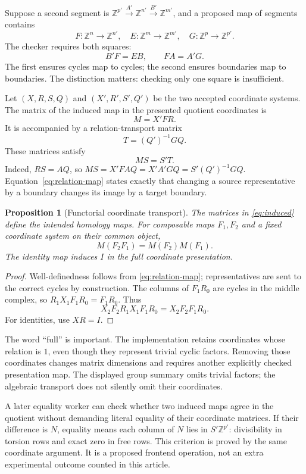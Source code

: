 \documentclass[11pt,letterpaper]{article}
\newtheorem{proposition}[theorem]{Proposition}
\theoremstyle{definition}\newtheorem{definition}[theorem]{Definition}
\theoremstyle{remark}\newtheorem{remark}[theorem]{Remark}
\newcommand{\Z}{\mathbb Z}\newcommand{\Q}{\mathbb Q}
\begin{document}
Suppose a second segment is $\Z^{p'}\xrightarrow{A'}\Z^{n'}
\xrightarrow{B'}\Z^{m'}$, and a proposed map of segments contains
\[
 F:\Z^n\to\Z^{n'},\quad E:\Z^m\to\Z^{m'},\quad
 G:\Z^p\to\Z^{p'}.
\]
The checker requires both squares:
\begin{equation}\label{eq:map-squares}
 B'F=EB,\qquad FA=A'G.
\end{equation}
The first ensures cycles map to cycles; the second ensures boundaries map to
boundaries. The distinction matters: checking only one square is insufficient.

Let $(X,R,S,Q)$ and $(X',R',S',Q')$ be the two accepted coordinate systems.
The matrix of the induced map in the presented quotient coordinates is
\begin{equation}\label{eq:induced}
 M=X'FR.
\end{equation}
It is accompanied by a relation-transport matrix
\[
 T=(Q')^{-1}GQ.
\]
These matrices satisfy
\begin{equation}\label{eq:relation-map}
 MS=S'T.
\end{equation}
Indeed, $RS=AQ$, so $MS=X'FAQ=X'A'GQ=S'(Q')^{-1}GQ$.
Equation~\eqref{eq:relation-map} states exactly that changing a source
representative by a boundary changes its image by a target boundary.

\begin{proposition}[Functorial coordinate transport]
The matrices in \eqref{eq:induced} define the intended homology maps. For
composable maps $F_1,F_2$ and a fixed coordinate system on their common object,
\[
 M(F_2F_1)=M(F_2)M(F_1).
\]
The identity map induces $I$ in the full coordinate presentation.
\end{proposition}
\begin{proof}
Well-definedness follows from \eqref{eq:relation-map}; representatives are sent
to the correct cycles by construction. The columns of $F_1R_0$ are cycles in
the middle complex, so $R_1X_1F_1R_0=F_1R_0$. Thus
\[
 X_2F_2R_1X_1F_1R_0=X_2F_2F_1R_0.
\]
For identities, use $XR=I$.
\end{proof}

The word ``full'' is important. The implementation retains coordinates whose
relation is $1$, even though they represent trivial cyclic factors. Removing
those coordinates changes matrix dimensions and requires another explicitly
checked presentation map. The displayed group summary omits trivial factors;
the algebraic transport does not silently omit their coordinates.

A later equality worker can check whether two induced maps agree in the
quotient without demanding literal equality of their coordinate matrices.
If their difference is $N$, equality means each column of $N$ lies in
$S'\Z^{p'}$: divisibility in torsion rows and exact zero in free rows.
This criterion is proved by the same coordinate argument. It is a proposed
frontend operation, not an extra experimental outcome counted in this article.
\end{document}
